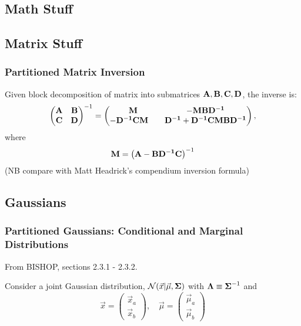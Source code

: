 \documentclass[11pt]{article}
\begin{document}
\newpage
\begin{appendices}
  \section{Math Stuff}

  \subsection{Matrix Stuff}
  \subsubsection{Partitioned Matrix Inversion}
  Given block decomposition of matrix into submatrices
  $\mathbf{A}, \mathbf{B}, \mathbf{C}, \mathbf{D}$, the inverse is:
  \begin{equation}
    \left(
      \begin{matrix}
        \mathbf{A} & \mathbf{B}\\
        \mathbf{C} & \mathbf{D}
      \end{matrix}
    \right)^{-1}
    =
    \left(
      \begin{matrix}
        \mathbf{M} & \mathbf{-M B D^{-1}}\\
        \mathbf{-D^{-1} C M}\quad & \mathbf{D^{-1}+D^{-1} C M B D^{-1}}
      \end{matrix}
    \right),
  \end{equation}
  where
  \begin{equation}
    \mathbf{M} = \left(\mathbf{A} - \mathbf{B D^{-1} C} \right)^{-1}
  \end{equation}
  (NB compare with Matt Headrick's compendium inversion formula)


\subsection{Gaussians}
\subsubsection{Partitioned Gaussians: Conditional and Marginal Distributions}
From BISHOP, sections 2.3.1 - 2.3.2.

Consider a joint Gaussian distribution, $\mathcal{N}(\vec{x} | \vec{\mu}, \boldsymbol{\Sigma})$
with $\boldsymbol{\Lambda} \equiv \boldsymbol{\Sigma}^{-1}$ and
\begin{equation}
  \vec{x} =
  \left(
    \begin{matrix}
      \vec{x}_a \\
      \vec{x}_b
    \end{matrix}
  \right)
  , \quad
  \vec{\mu} =
  \left(
    \begin{matrix}
      \vec{\mu}_a \\
      \vec{\mu}_b
    \end{matrix}
  \right)
\end{equation}


\end{appendices}
\end{document}
